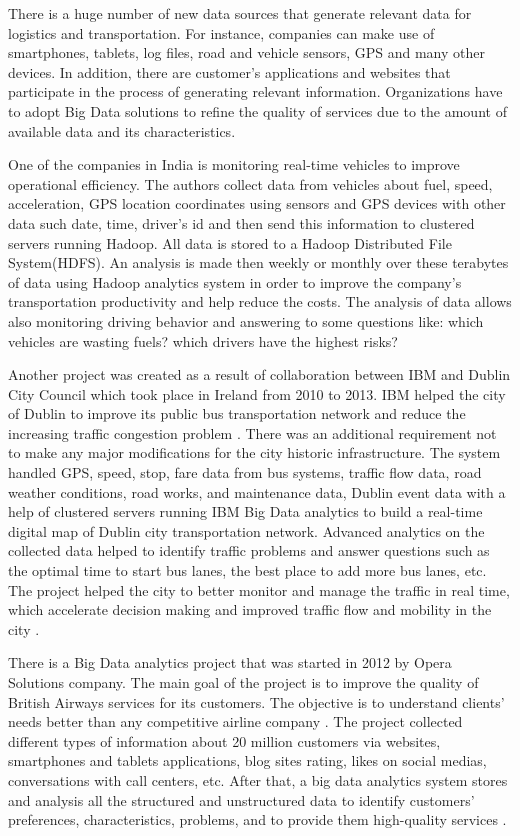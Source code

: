 \documentclass[runningheads]{llncs}
\begin{document}
There is a huge number of new data sources that generate relevant data for logistics and transportation. For instance, companies can make use of smartphones, tablets, log files, road and vehicle sensors, GPS and many other devices. In addition, there are customer's applications and websites that participate in the process of generating relevant information. Organizations have to adopt Big Data solutions to refine the quality of services due to the amount of available data and its characteristics.

One of the companies in India is monitoring real-time vehicles to improve operational efficiency. The authors collect data from vehicles about fuel, speed, acceleration, GPS location coordinates using sensors and GPS devices with other data such date, time, driver's id and then send this information to clustered servers running Hadoop. All data is stored to a Hadoop Distributed File System(HDFS). An analysis is made then weekly or monthly over these terabytes of data using Hadoop analytics system in order to improve the company's transportation productivity and help reduce the costs. The analysis of data allows also monitoring driving behavior and answering to some questions like: which vehicles are wasting fuels? which drivers have the highest risks? \cite{TRANSPORT}

Another project was created as a result of collaboration between IBM and Dublin City Council which took place in Ireland from 2010 to 2013. IBM helped the city of Dublin to improve its public bus transportation network and reduce the increasing traffic congestion problem \cite{TRANSPORTREPORT}. There was an additional requirement not to make any major modifications for the city historic infrastructure. The system handled GPS, speed, stop, fare data from bus systems, traffic flow data, road weather conditions, road works, and maintenance data, Dublin event data with a help of clustered servers running IBM Big Data analytics to build a real-time digital map of Dublin city transportation network. Advanced analytics on the collected data helped to identify traffic problems and answer questions such as the optimal time to start bus lanes, the best place to add more bus lanes, etc. The project helped the city to better monitor and manage the traffic in real time, which accelerate decision making and improved traffic flow and mobility in the city \cite{TRANSPORT}. 

There is a Big Data analytics project that was started in 2012 by Opera Solutions company. The main goal of the project is to improve the quality of British Airways services for its customers. The objective is to understand clients' needs better than any competitive airline company \cite{TRANSPORTREPORT}. The project collected different types of information about 20 million customers via websites, smartphones and tablets applications, blog sites rating, likes on social medias, conversations with call centers, etc. After that, a big data analytics system stores and
analysis all the structured and unstructured data to identify customers' preferences, characteristics, problems, and to provide them high-quality services \cite{TRANSPORT}. 
\end{document}
